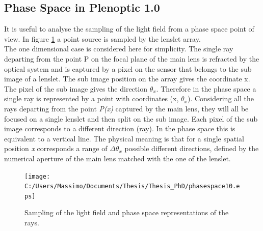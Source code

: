 \subsection{Phase Space in Plenoptic 1.0}
\label{sec:phase_space}
It is useful to analyse the sampling of the light field from a phase space point of view. In figure \ref{fig:plenoptic6} a point source is sampled by the lenslet array.\\
 The one dimensional case is considered here for simplicity. The single ray departing from the point P on the focal plane of the main lens is refracted by the optical system and is captured by a pixel on the sensor that belongs to the sub image of a lenslet. The sub image position on the array gives the coordinate x. The pixel of the sub image gives the direction $\theta_x$. Therefore in the phase space a single ray is represented by a point with coordinates (x, $\theta_x$).
Considering all the rays departing from the point \textit{P(x)} captured by the main lens, they will all be focused on a single lenslet and then split on the sub image. Each pixel of the sub image corresponds to a different direction (ray). In the phase space this is equivalent to a vertical line. The physical meaning is that for a single spatial position \textit{x} corresponds a range of $\Delta \theta_x$ possible different directions, defined by the numerical aperture of the main lens matched with the one of the lenslet.\\
\newpage
\begin{figure}[H]
	\centering
	\texttt{[image: C:/Users/Massimo/Documents/Thesis/Thesis\_PhD/phasespace10.eps]}
	\caption{\label{fig:plenoptic6}Sampling of the light field and phase space representations of the rays.  }
\end{figure}
\newpage

